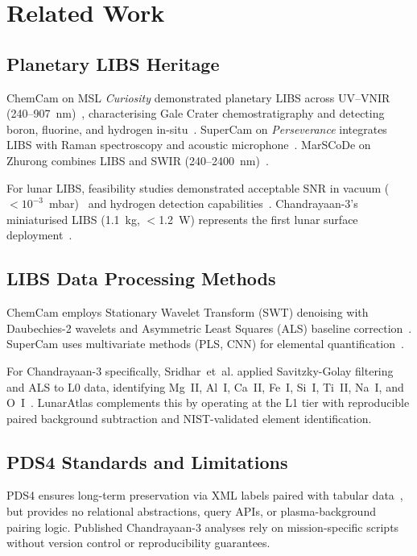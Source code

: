 \documentclass[a4paper,twocolumn,10pt]{article}
\begin{document}
\section{Related Work}
\label{sec:related}

\subsection{Planetary LIBS Heritage}

ChemCam on MSL \emph{Curiosity} demonstrated planetary LIBS across
UV--VNIR (240--907~nm)~\cite{Wiens2012,Maurice2012}, characterising Gale
Crater chemostratigraphy and detecting boron, fluorine, and hydrogen
in-situ~\cite{Gasda2017,Schroder2015}. SuperCam on \emph{Perseverance}
integrates LIBS with Raman spectroscopy and acoustic
microphone~\cite{Wiens2020,Maurice2022}. MarSCoDe on Zhurong combines
LIBS and SWIR (240--2400~nm)~\cite{Xu2021,Zhao2023}.

For lunar LIBS, feasibility studies demonstrated acceptable SNR in vacuum
($<10^{-3}$~mbar)~\cite{Knight2000,Lasue2012} and hydrogen detection
capabilities~\cite{Yumoto2023}. Chandrayaan-3's miniaturised LIBS
(1.1~kg, $<$1.2~W) represents the first lunar surface
deployment~\cite{Laxmiprasad2020}.

\subsection{LIBS Data Processing Methods}

ChemCam employs Stationary Wavelet Transform (SWT) denoising with
Daubechies-2 wavelets and Asymmetric Least Squares (ALS) baseline
correction~\cite{Clegg2017}. SuperCam uses multivariate methods (PLS,
CNN) for elemental quantification~\cite{Anderson2022,Castorena2021}.

For Chandrayaan-3 specifically, Sridhar~et~al. applied Savitzky-Golay
filtering and ALS to L0 data, identifying Mg~II, Al~I, Ca~II, Fe~I,
Si~I, Ti~II, Na~I, and O~I~\cite{Sridhar2025}. LunarAtlas complements
this by operating at the L1 tier with reproducible paired background
subtraction and NIST-validated element identification.

\subsection{PDS4 Standards and Limitations}

PDS4 ensures long-term preservation via XML labels paired with tabular
data~\cite{Hughes2018}, but provides no relational abstractions, query
APIs, or plasma-background pairing logic. Published Chandrayaan-3
analyses rely on mission-specific scripts without version control or
reproducibility guarantees.
\end{document}
